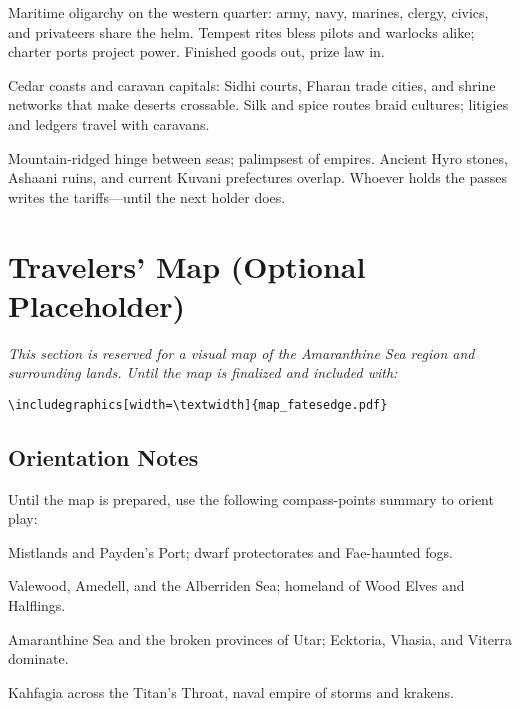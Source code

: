 \documentclass[11pt]{article}
\begin{document}
\begin{description}[leftmargin=2.2cm]
  \item[Kahfagia] Maritime oligarchy on the western quarter: army, navy, marines, clergy, civics, and privateers share the helm. Tempest rites bless pilots and warlocks alike; charter ports project power. Finished goods out, prize law in.

  \item[Galanina \& Fharan Lands] Cedar coasts and caravan capitals: Sidhi courts, Fharan trade cities, and shrine networks that make deserts crossable. Silk and spice routes braid cultures; litigies and ledgers travel with caravans.

  \item[Haayr Peninsula] Mountain-ridged hinge between seas; palimpsest of empires. Ancient Hyro stones, Ashaani ruins, and current Kuvani prefectures overlap. Whoever holds the passes writes the tariffs—until the next holder does.
\end{description}

\section{Travelers' Map (Optional Placeholder)}

\noindent
\textit{This section is reserved for a visual map of the Amaranthine Sea region and surrounding lands. Until the map is finalized and included with:}  
\begin{center}
  \texttt{\textbackslash includegraphics[width=\textbackslash textwidth]\{map\_fatesedge.pdf\}}
\end{center}

\subsection*{Orientation Notes}
Until the map is prepared, use the following compass-points summary to orient play:  

\begin{description}[leftmargin=2cm]
  \item[North] Mistlands and Payden’s Port; dwarf protectorates and Fae-haunted fogs.  
  \item[East] Valewood, Amedell, and the Alberriden Sea; homeland of Wood Elves and Halflings.  
  \item[South] Amaranthine Sea and the broken provinces of Utar; Ecktoria, Vhasia, and Viterra dominate.  
  \item[West] Kahfagia across the Titan’s Throat, naval empire of storms and krakens.  
\end{description}
\end{document}
